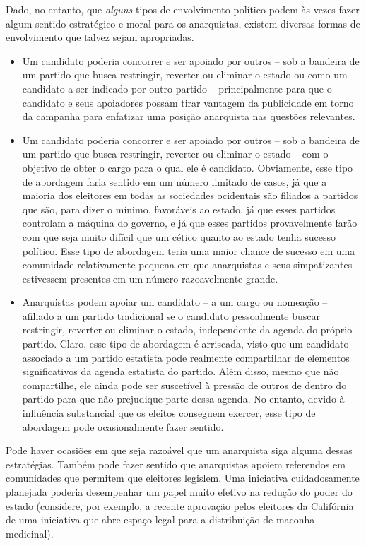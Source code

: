 Dado, no entanto, que \emph{alguns} tipos de envolvimento político podem às vezes fazer algum sentido estratégico e moral para os anarquistas, existem diversas formas de envolvimento que talvez sejam apropriadas.

\begin{itemize}
\item Um candidato poderia concorrer e ser apoiado por outros -- sob a bandeira de um partido que busca restringir, reverter ou eliminar o estado ou como um candidato a ser indicado por outro partido -- principalmente para que o candidato e seus apoiadores possam tirar vantagem da publicidade em torno da campanha para enfatizar uma posição anarquista nas questões relevantes.

\item Um candidato poderia concorrer e ser apoiado por outros -- sob a bandeira de um partido que busca restringir, reverter ou eliminar o estado -- com o objetivo de obter o cargo para o qual ele é candidato. Obviamente, esse tipo de abordagem faria sentido em um número limitado de casos, já que a maioria dos eleitores em todas as sociedades ocidentais são filiados a partidos que são, para dizer o mínimo, favoráveis ao estado, já que esses partidos controlam a máquina do governo, e já que esses partidos provavelmente farão com que seja muito difícil que um cético quanto ao estado tenha sucesso político. Esse tipo de abordagem teria uma maior chance de sucesso em uma comunidade relativamente pequena em que anarquistas e seus simpatizantes estivessem presentes em um número razoavelmente grande.

\item Anarquistas podem apoiar um candidato -- a um cargo ou nomeação -- afiliado a um partido tradicional se o candidato pessoalmente buscar restringir, reverter ou eliminar o estado, independente da agenda do próprio partido. Claro, esse tipo de abordagem é arriscada, visto que um candidato associado a um partido estatista pode realmente compartilhar de elementos significativos da agenda estatista do partido. Além disso, mesmo que não compartilhe, ele ainda pode ser suscetível à pressão de outros de dentro do partido para que não prejudique parte dessa agenda. No entanto, devido à influência substancial que os eleitos conseguem exercer, esse tipo de abordagem pode ocasionalmente fazer sentido.
\end{itemize}

Pode haver ocasiões em que seja razoável que um anarquista siga alguma dessas estratégias. Também pode fazer sentido que anarquistas apoiem referendos em comunidades que permitem que eleitores legislem. Uma iniciativa cuidadosamente planejada poderia desempenhar um papel muito efetivo na redução do poder do estado (considere, por exemplo, a recente aprovação pelos eleitores da Califórnia de uma iniciativa que abre espaço legal para a distribuição de maconha medicinal).

